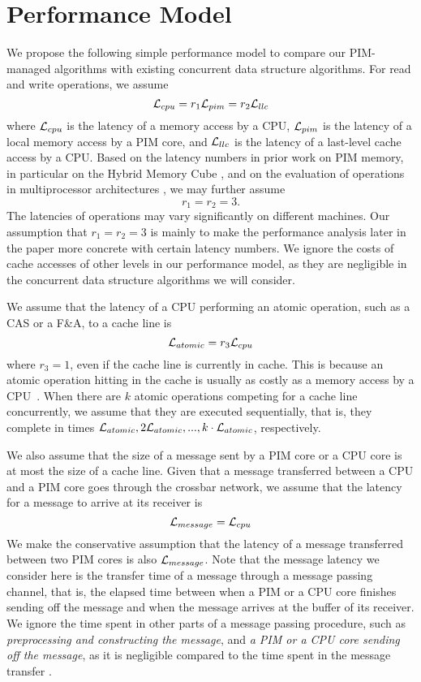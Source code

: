 \section{Performance Model}
\label{section:performance_model}
We propose the following simple performance model to compare 
our PIM-managed algorithms with existing concurrent data structure algorithms.
For read and write operations, we assume 
$$\mathcal{L}_{cpu} = r_1\mathcal{L}_{pim} = r_2\mathcal{L}_{llc}$$
where $\mathcal{L}_{cpu}$ is the latency of a memory access by a CPU,
$\mathcal{L}_{pim}$ is the latency of a local memory access by a PIM core, and
$\mathcal{L}_{llc}$ is the latency of a last-level cache access by a CPU.
Based on the latency numbers in prior work on PIM memory, 
in particular on the Hybrid Memory Cube \cite{website:HMC, Azarkhish16}, 
and on the evaluation of operations in multiprocessor architectures \cite{David13},
we may further assume 
$$r_1 = r_2 = 3.$$ 
The latencies of operations may vary significantly on different machines.  
Our assumption that $r_1 = r_2 = 3$ is mainly to make the performance analysis later in the paper 
more concrete with certain latency numbers. 
We ignore the costs of cache accesses of other levels in our performance model,
as they are negligible in the concurrent data structure algorithms we will consider.

We assume that the latency of a CPU performing an atomic operation, such as a CAS or a F\&A,
to a cache line is 
$$\mathcal{L}_{atomic} = r_3\mathcal{L}_{cpu}$$ 
where $r_3 = 1$, even if the cache line is currently in cache.
This is because an atomic operation hitting in the cache is usually 
as costly as a memory access by a CPU~\cite{David13}.
When there are $k$ atomic operations competing for a cache line concurrently,
we assume that they are executed sequentially, that is,
they complete in times $\mathcal{L}_{atomic}, 2\mathcal{L}_{atomic},..., k\cdot\mathcal{L}_{atomic}$, respectively.

We also assume that the size of a message sent by a PIM core or a CPU core is at most 
the size of a cache line.
Given that a message transferred between a CPU and a PIM core goes through
the crossbar network, we assume that the latency for a message to arrive at its receiver is 
$$\mathcal{L}_{message} = \mathcal{L}_{cpu}$$
We make the conservative assumption that the latency of a message transferred 
between two PIM cores is also $\mathcal{L}_{message}$.
Note that the message latency we consider here is the transfer time of a message
through a message passing channel, that is, the elapsed time between 
when a PIM or a CPU core finishes sending off the message and when the message arrives at the buffer of its receiver.
We ignore the time spent in other parts of a message passing procedure,
such as \emph{preprocessing and constructing the message}, and \emph{a PIM or a CPU core sending off the message},
as it is negligible compared to the time spent in the message transfer \cite{Azarkhish16}.